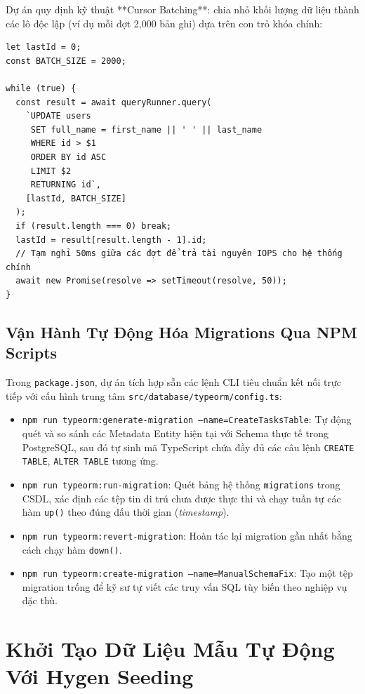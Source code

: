 \documentclass[12pt,a4paper,oneside]{book}
\begin{document}
Dự án quy định kỹ thuật **Cursor Batching**: chia nhỏ khối lượng dữ liệu thành các lô độc lập (ví dụ mỗi đợt 2,000 bản ghi) dựa trên con trỏ khóa chính:
\begin{Verbatim}[fontsize=\small]
let lastId = 0;
const BATCH_SIZE = 2000;

while (true) {
  const result = await queryRunner.query(
    `UPDATE users 
     SET full_name = first_name || ' ' || last_name 
     WHERE id > $1 
     ORDER BY id ASC 
     LIMIT $2 
     RETURNING id`,
    [lastId, BATCH_SIZE]
  );
  if (result.length === 0) break;
  lastId = result[result.length - 1].id;
  // Tạm nghỉ 50ms giữa các đợt để trả tài nguyên IOPS cho hệ thống chính
  await new Promise(resolve => setTimeout(resolve, 50));
}
\end{Verbatim}

\section{Vận Hành Tự Động Hóa Migrations Qua NPM Scripts}
Trong \texttt{package.json}, dự án tích hợp sẵn các lệnh CLI tiêu chuẩn kết nối trực tiếp với cấu hình trung tâm \texttt{src/database/typeorm/config.ts}:
\begin{itemize}
  \item \texttt{npm run typeorm:generate-migration --name=CreateTasksTable}: Tự động quét và so sánh các Metadata Entity hiện tại với Schema thực tế trong PostgreSQL, sau đó tự sinh mã TypeScript chứa đầy đủ các câu lệnh \texttt{CREATE TABLE}, \texttt{ALTER TABLE} tương ứng.
  \item \texttt{npm run typeorm:run-migration}: Quét bảng hệ thống \texttt{migrations} trong CSDL, xác định các tệp tin di trú chưa được thực thi và chạy tuần tự các hàm \texttt{up()} theo đúng dấu thời gian (\textit{timestamp}).
  \item \texttt{npm run typeorm:revert-migration}: Hoàn tác lại migration gần nhất bằng cách chạy hàm \texttt{down()}.
  \item \texttt{npm run typeorm:create-migration --name=ManualSchemaFix}: Tạo một tệp migration trống để kỹ sư tự viết các truy vấn SQL tùy biến theo nghiệp vụ đặc thù.
\end{itemize}

\chapter{Khởi Tạo Dữ Liệu Mẫu Tự Động Với Hygen Seeding}
\end{document}
